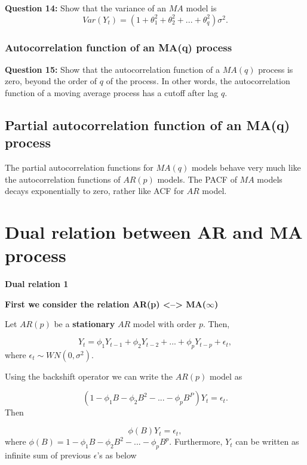 \documentclass[
  11pt,
  a4paper,
]{report}
\begin{document}
\textbf{Question 14:} Show that the variance of an \(MA\) model is
\[Var(Y_t)=(1+\theta_1^2+\theta_2^2+...+\theta_q^2)\sigma^2.\]

\subsection{Autocorrelation function of an MA(q)
process}\label{autocorrelation-function-of-an-maq-process}

\textbf{Question 15:} Show that the autocorrelation function of a
\(MA(q)\) process is zero, beyond the order of \(q\) of the process. In
other words, the autocorrelation function of a moving average process
has a cutoff after lag \(q\).

\section{Partial autocorrelation function of an MA(q)
process}\label{partial-autocorrelation-function-of-an-maq-process}

The partial autocorrelation functions for \(MA(q)\) models behave very
much like the autocorrelation functions of \(AR(p)\) models. The PACF of
\(MA\) models decays exponentially to zero, rather like ACF for \(AR\)
model.


\chapter{Dual relation between AR and MA
process}\label{dual-relation-between-ar-and-ma-process}

\textbf{Dual relation 1}

\textbf{First we consider the relation AR(p) \textless--\textgreater{}
MA(}\(\infty\)\textbf{)}

Let \(AR(p)\) be a \textbf{stationary} \(AR\) model with order \(p\).
Then,

\[Y_t = \phi_1Y_{t-1}+ \phi_2Y_{t-2}+...+ \phi_pY_{t-p}+\epsilon_t,\]
where \(\epsilon_t \sim WN(0, \sigma^2).\)

Using the backshift operator we can write the \(AR(p)\) model as

\[(1-\phi_1B-\phi_2B^2-...-\phi_pB^P)Y_t=\epsilon_t.\] Then

\[\phi(B)Y_t=\epsilon_t,\] where
\(\phi(B)=1-\phi_1B-\phi_2B^2-...-\phi_pB^p.\) Furthermore, \(Y_t\) can
be written as infinite sum of previous \(\epsilon\)'s as below
\end{document}
